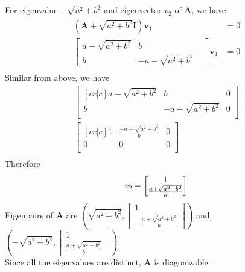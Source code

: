 \documentclass[12pt]{article}
\newcommand{\matr}[1]{\mathbf{#1}}
\begin{document}
For eigenvalue $-\sqrt{a^2+b^2}$ and eigenvector $v_2$ of $\matr A$, we have
\begin{align*}
	\left(\matr A+\sqrt{a^2+b^2} \matr I\right) \matr v_1 & = 0 \\
	\begin{bmatrix}
	a - \sqrt{a^{2} + b^{2}} & b                          &   \\
	b                        & - a - \sqrt{a^{2} + b^{2}} &   
	\end{bmatrix} 
	\matr v_1                             & =0  \\
\end{align*}
Similar from above, we have
\begin{align*}
	\begin{bmatrix}[cc|c]
	a - \sqrt{a^{2} + b^{2}} & b                                       & 0 \\
	b                        & - a - \sqrt{a^{2} + b^{2}}              & 0 \\
	\end{bmatrix} \\
	\begin{bmatrix}[cc|c]
	1                        & \frac  {-a - \sqrt{a^{2} + b^{2}}}    b & 0 \\
	0                        & 0                                       & 0 \\
	\end{bmatrix} \\
\end{align*}
Therefore
\begin{equation*}
	v_2=\begin{bmatrix}
	1 \\
	\frac  {a + \sqrt{a^{2} + b^{2}}} b
	\end{bmatrix} \\
\end{equation*} 
Eigenpairs of $\matr A$ are $\left(
\sqrt{a^2+b^2},
\begin{bmatrix}
	1                                     \\
	- \frac  {a + \sqrt{a^{2} + b^{2}}} b 
\end{bmatrix}
\right)$ and $\left(
-\sqrt{a^2+b^2},
\begin{bmatrix}
	1                                   \\ 
	\frac  {a + \sqrt{a^{2} + b^{2}}} b 
\end{bmatrix}
\right)$\\
Since all the eigenvalues are distinct, $\matr A$ is diagonizable. \\ \\
\end{document}
